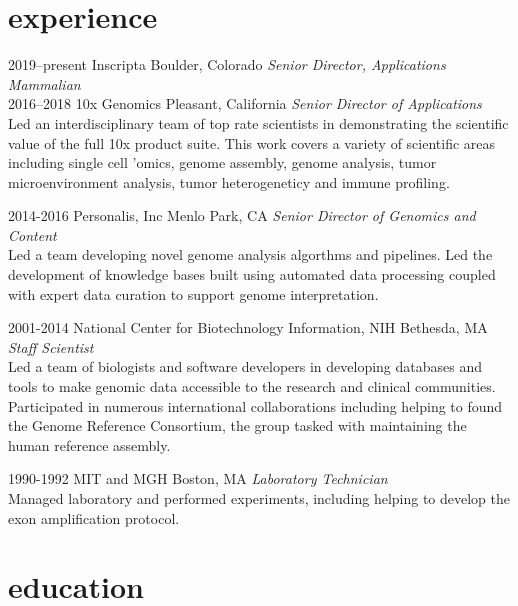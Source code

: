 \documentclass[]{dmc-cv} %
\begin{document}
\section{experience}

\begin{entrylist}

\entry
{2019--present}
{Inscripta}
{Boulder, Colorado}
{\emph{Senior Director, Applications Mammalian}}\\

\entry
{2016--2018}
{10x Genomics}
{Pleasant, California}
{\emph{Senior Director of Applications} \\
Led an interdisciplinary team of top rate scientists in demonstrating the scientific value of the full
10x product suite. This work covers a variety of scientific areas including single cell 'omics, genome assembly, genome analysis,
tumor microenvironment analysis, tumor heterogeneticy and immune profiling.
}

\entry
{2014-2016}
{Personalis, Inc}
{Menlo Park, CA}
{\emph{Senior Director of Genomics and Content} \\
Led a team developing novel genome analysis algorthms and pipelines. Led the development of knowledge bases built using automated data processing coupled with expert data curation to support genome interpretation.
}

\entry
{2001-2014}
{National Center for Biotechnology Information, NIH}
{Bethesda, MA}
{\emph{Staff Scientist} \\
Led a team of biologists and software developers in developing databases and tools to make genomic data accessible to the research and clinical communities. Participated in numerous international collaborations including helping to found the Genome Reference Consortium, the group tasked with maintaining the human reference assembly.
}

\entry
{1990-1992}
{MIT and MGH}
{Boston, MA}
{\emph{Laboratory Technician}\\
Managed laboratory and performed experiments, including helping to develop the exon amplification protocol.
}

\end{entrylist}


\section{education}
\end{document}
